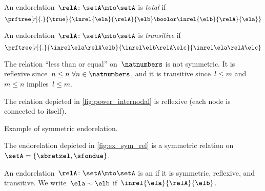 \begin{ctdefinition}
    \label{def:endo_total}
An endorelation~$\relA\colon \setA\mto \setA$ is \emph{total} if
\begin{equation}
\prftree[r]{.}{\true}{\inrel{\ela}{\relA}{\elb} \boolor \inrel{\elb}{\relA}{\ela}}
\end{equation}

\end{ctdefinition}


\begin{ctdefinition}
    \label{def:endo_transitive}
An endorelation~$\relA\colon \setA\mto \setA$ is \emph{transitive} if
\begin{equation}
\prftree[r]{.}{
                \inrel \ela \relA \elb
            }{
                \inrel \elb \relA \elc
            }{
                \inrel \ela \relA \elc
            }
\end{equation}
\end{ctdefinition}

\begin{example}
    The relation ``less than or equal'' on~$\natnumbers$ is not symmetric.
    It is reflexive since~$n\leq n \ \forall n\in \natnumbers$, and it is transitive since~$l\leq m$ and~$m\leq n$ implies~$l\leq m$.
\end{example}

\begin{example}
    The relation depicted in \cref{fig:power_internodal} is reflexive (each node is connected to itself).
\end{example}
\begin{marginfigure}
    \centering
    \caption{Example of symmetric endorelation.}
    \label{fig:ex_sym_rel}
\end{marginfigure}
\begin{example}
    The endorelation depicted in \cref{fig:ex_sym_rel} is a symmetric relation on~$\setA=\{\sbretzel,\sfondue\}$.
\end{example}


\begin{ctdefinition}
    \label{def:equivalence-relation}
    An endorelation~$\relA\colon \setA\mto \setA$ is an \emph{} if it is symmetric, reflexive, and transitive.
    We write~$\ela\sim \elb$ if~$\inrel{\ela}{\relA}{\elb}$.
\end{ctdefinition}

